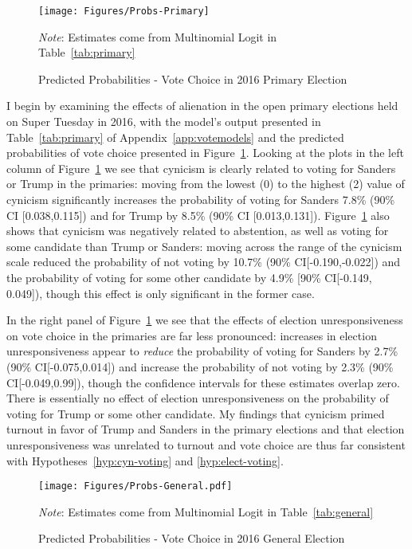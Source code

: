 \documentclass[12pt]{article}
\begin{document}
\begin{figure}[!ht]
	\centering
	\texttt{[image: Figures/Probs-Primary]}
	\caption{Predicted Probabilities - Vote Choice in 2016 Primary Election}\label{fig:primary}
	\vspace{-8pt}
	{\scriptsize \textit{Note}: Estimates come from Multinomial Logit in Table~\ref{tab:primary} \par}
\end{figure}

I begin by examining the effects of alienation in the open primary elections held on Super Tuesday in 2016, with the model's output presented in Table~\ref{tab:primary} of Appendix~\ref{app:votemodels} and the predicted probabilities of vote choice presented in Figure~\ref{fig:primary}. Looking at the plots in the left column of Figure~\ref{fig:primary} we see that cynicism is clearly related to voting for Sanders or Trump in the primaries: moving from the lowest (0) to the highest (2) value of cynicism significantly increases the probability of voting for Sanders 7.8\% (90\% CI [0.038,0.115]) and for Trump by 8.5\% (90\% CI [0.013,0.131]). Figure~\ref{fig:primary} also shows that cynicism was negatively related to abstention, as well as voting for some candidate than Trump or Sanders: moving across the range of the cynicism scale reduced the probability of not voting by 10.7\% (90\% CI[-0.190,-0.022]) and the probability of voting for some other candidate by 4.9\% [90\% CI[-0.149, 0.049]), though this effect is only significant in the former case. 

In the right panel of Figure~\ref{fig:primary} we see that the effects of election unresponsiveness on vote choice in the primaries are far less pronounced: increases in election unresponsiveness appear to \textit{reduce} the probability of voting for Sanders by 2.7\% (90\% CI[-0.075,0.014]) and increase the probability of not voting by 2.3\% (90\% CI[-0.049,0.99]), though the confidence intervals for these estimates overlap zero. There is essentially no effect of election unresponsiveness on the probability of voting for Trump or some other candidate. My findings that cynicism primed turnout in favor of Trump and Sanders in the primary elections and that election unresponsiveness was unrelated to turnout and vote choice are thus far consistent with Hypotheses~\ref{hyp:cyn-voting} and \ref{hyp:elect-voting}.

\begin{figure}[!ht]
	\centering
	\texttt{[image: Figures/Probs-General.pdf]}
	\caption{Predicted Probabilities - Vote Choice in 2016 General Election}\label{fig:general}
	\vspace{-8pt}
	{\scriptsize \textit{Note}: Estimates come from Multinomial Logit in Table~\ref{tab:general} \par}
\end{figure}
\end{document}
